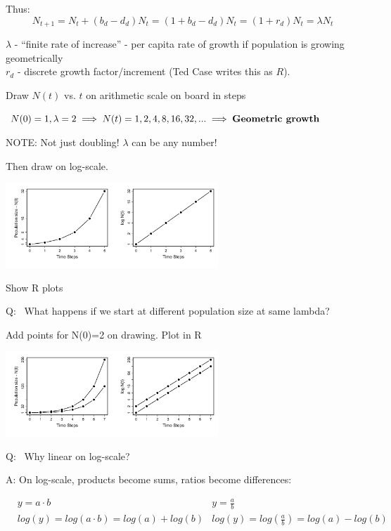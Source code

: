 \documentclass{article}
\newcommand{\note}[1]{\colorbox{gray!20}{#1}}
\begin{document}
Thus:
\begin{equation*}
	N_{t+1}=N_t+(b_d-d_d)N_t=(1+b_d-d_d)N_t=(1+r_d)N_t=\lambda N_t
\end{equation*}

$\lambda$ - “finite rate of increase” - per capita rate of growth if population is growing geometrically\\ 
$r_d$ - discrete growth factor/increment (Ted Case writes this as $R$).

\vspace{1cm}

\note{Draw $N(t)$ vs. $t$ on arithmetic scale on board in steps}
\begin{center}
$N(0)=1, \lambda=2 \implies N(t)=1,2,4,8,16,32,... \implies \text{\textbf{Geometric growth}}$
\end{center}
NOTE:  Not just doubling!  $\lambda$ can be any number!

\note{Then draw on log-scale.}
\begin{center}
\includegraphics[width=8cm]{figs/image}
\end{center}

\note{Show R plots}

\note{Q:}  What happens if we start at different population size at same lambda?

\note{Add points for N(0)=2 on drawing. Plot in R}
\begin{center}
\includegraphics[width=8cm]{figs/image0}
\end{center}

\note{Q:}  Why linear on log-scale?

\note{A:} On log-scale, products become sums, ratios become differences:

\begin{align*}
& y=a \cdot b & y=\frac{a}{b}  & \\
 & log(y)=log(a \cdot b) = log(a) + log (b) & log(y)=log\left(\frac{a}{b}\right )=log(a)-log(b)&
\end{align*}
\end{document}
